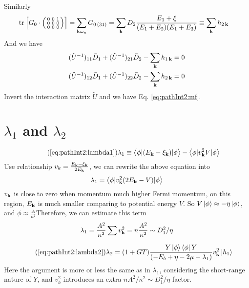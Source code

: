 Similarly
\begin{equation}
\begin{split}
\text{tr}\left[{G_{0}}\cdot\left(\begin{smallmatrix}0&0&1\\0&0&0\\0&0&0\end{smallmatrix}\right)\right]&=\sum_{\mathbf{k}\omega_{n}}G_{0\,(31)}
=\sum_{\mathbf{k}}D_{2}\frac{E_{1}+\xi}{(E_{1}+E_{2})(E_{1}+E_{3})}\equiv\sum_{\mathbf{k}}h_{2\,\mathbf{k}}
\end{split}
\end{equation}
And we have 
 \begin{align*}
(\tilde{U}^{-1})_{11}\bar{D}_{1}+(\tilde{U}^{-1})_{21}\bar{D}_{2}-\sum_{\mathbf{k}}h_{1\,\mathbf{k}}=0\\
(\tilde{U}^{-1})_{12}\bar{D}_{1}+(\tilde{U}^{-1})_{22}\bar{D}_{2}-\sum_{\mathbf{k}}h_{2\,\mathbf{k}}=0
 \end{align*}
Invert the interaction matrix $\tilde{U}$ and we have Eq.  \ref{eq:pathInt2:mf}.






\section{$\lambda_{1}$ and $\lambda_{2}$\label{sec:pathInt2:lambda}}
\begin{equation}\tag{\ref{eq:pathInt2:lambda1}}
\lambda_{1}\equiv\avs{\phi}{(E_{\vk}-\xi_{\vk})}{\phi}-\avs{\phi}{v_{\vk}^{2}V}{\phi}
\end{equation}
Use relationship $v_{k}=\frac{E_{\mathbf{k}}-\xi_{\mathbf{k}}}{2E_{\mathbf{k}}}$, we can rewrite the above equation into 
\begin{equation*}
\lambda_{1}=\bigl<{\phi{\lvert{v_{\ensuremath{\mathbf{k}}}^{2}(2E_{\ensuremath{\mathbf{k}}}-V)}\rvert}\phi}\bigr>
\end{equation*}
$v_{\mathbf{k}}$ is close to zero when momentum much higher Fermi momentum, on this region, $E_{\mathbf{k}}$ is much smaller comparing to potential energy $V$.  So $V\left|\phi\right>\approx-\eta\left|\phi\right>$, and $\phi\approx\frac{A}{\kappa^{2}}$Therefore, we can estimate this term 
\begin{equation}
\lambda_{1}=\frac{A^{2}}{\kappa^{2}}\sum{}v_{\mathbf{k}}^{2}=n\frac{A^{2}}{\kappa^{2}}\sim{}D_{1}^{2}/\eta
\end{equation}







\begin{equation}\tag{\ref{eq:pathInt2:lambda2}}
\lambda_{2}=(1+GT)\frac{Y\ket{\phi}\bra{\phi}{Y}}{\br{-E_{b}+\eta-2\mu-\lambda_{1}}}v_{\vk}^{2}\ket{{h_{1}}}
\end{equation}
Here the argument is more or less the same as in $\lambda_{1}$, considering the short-range nature of $Y$, and $v_{k}^{2}$ introduces an extra $nA^{2}/\kappa^{2}\sim{}D_{1}^{2}/\eta$ factor.  

